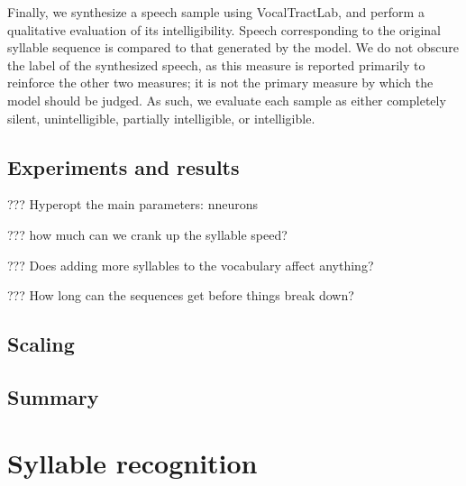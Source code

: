 Finally, we synthesize a speech sample
using VocalTractLab,
and perform a qualitative evaluation
of its intelligibility.
Speech corresponding to the
original syllable sequence is compared
to that generated by the model.
We do not obscure the label
of the synthesized speech,
as this measure is reported primarily
to reinforce the other two measures;
it is not the primary measure
by which the model should be judged.
As such, we evaluate each sample
as either completely silent,
unintelligible, partially intelligible,
or intelligible.

\subsection{Experiments and results}

??? Hyperopt the main parameters: nneurons

??? how much can we crank up the syllable speed?

??? Does adding more syllables to the vocabulary affect anything?

??? How long can the sequences get before things break down?

\subsection{Scaling}






\subsection{Summary}


\section{Syllable recognition}

